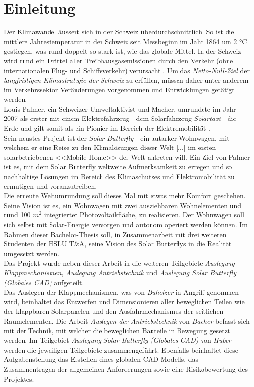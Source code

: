 \section{Einleitung}
Der Klimawandel äussert sich in der Schweiz überdurchschnittlich. So ist die mittlere Jahrestemperatur in der Schweiz seit Messbeginn im Jahr 1864 um 2 °C gestiegen, was rund doppelt so stark ist, wie das globale Mittel. In der Schweiz wird rund ein Drittel aller Treibhausgasemissionen durch den Verkehr (ohne internationalen Flug- und Schiffsverkehr) verursacht \cite{BAFU}. Um das \emph{Netto-Null-Ziel} der \emph{langfristigen Klimastrategie der Schweiz} zu erfüllen, müssen daher unter anderem im Verkehrssektor Veränderungen vorgenommen und Entwicklungen getätigt werden.\\
Louis Palmer, ein Schweizer Umweltaktivist und \glqq Macher\grqq{}, umrundete im Jahr 2007 als erster mit einem Elektrofahrzeug - dem Solarfahrzeug \emph{Solartaxi} - die Erde und gilt somit als ein Pionier im Bereich der Elektromobilität \cite{Palmer}.\\
Sein neustes Projekt ist der \emph{Solar Butterfly} - ein autarker Wohnwagen, mit welchem er \glqq eine Reise zu den Klimalösungen dieser Welt [...] im ersten solarbetriebenen <<Mobile Home>> der Welt\grqq{} antreten will. Ein Ziel von Palmer ist es, mit dem Solar Butterfly weltweite Aufmerksamkeit zu erregen und so nachhaltige Lösungen im Bereich des Klimaschutzes und Elektromobilität zu ermutigen und voranzutreiben.\\
Die erneute Weltumrundung soll dieses Mal \glqq mit etwas mehr Komfort\grqq{} geschehen. Seine Vision ist es, ein Wohnwagen mit zwei ausziehbaren Wohnelementen und rund 100 $m^2$ integrierter Photovoltaikfläche, zu realisieren. Der Wohnwagen soll sich selbst mit Solar-Energie versorgen und autonom operiert werden können. Im Rahmen dieser Bachelor-Thesis soll, in Zusammenarbeit mit drei weiteren Studenten der HSLU T\&A, seine Vision des Solar Butterflys in die Realität umgesetzt werden.\\
Das Projekt wurde neben dieser Arbeit in die weiteren Teilgebiete \emph{Auslegung Klappmechanismen}, \emph{Auslegung Antriebstechnik} und \emph{Auslegung Solar Butterfly (Globales CAD)} aufgeteilt.\\
Das Auslegen der Klappmechanismen, was von \emph{Buholzer} in Angriff genommen wird, beinhaltet das Entwerfen und Dimensionieren aller beweglichen Teilen wie der klappbaren Solarpanelen und den Ausfahrmechanismus der seitlichen Raumelementen. Die Arbeit \emph{Auslegen der Antriebstechnik} von \emph{Bacher} befasst sich mit der Technik, mit welcher die beweglichen Bauteile in Bewegung gesetzt werden. Im Teilgebiet \emph{Auslegung Solar Butterfly (Globales CAD)} von \emph{Huber} werden die jeweiligen Teilgebiete zusammengeführt. Ebenfalls beinhaltet diese Aufgabenstellung das Erstellen eines globalen CAD-Modells, das Zusammentragen der allgemeinen Anforderungen sowie eine Risikobewertung des Projektes.


